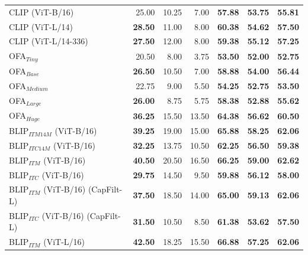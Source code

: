 \begin{table}[ht]
\begin{tabular}{l|rrr|rrr}
 CLIP (ViT-B/16)                     & 25.00          & 10.25          & 7.00           & \textbf{57.88} & \textbf{53.75} & \textbf{55.81} \\
 CLIP (ViT-L/14)                     & \textbf{28.50} & 11.00          & 8.00           & \textbf{60.38} & \textbf{54.62} & \textbf{57.50} \\
 CLIP (ViT-L/14-336)                 & \textbf{27.50} & 12.00          & 8.00           & \textbf{59.38} & \textbf{55.12} & \textbf{57.25} \\
 OFA$_{Tiny}$                        & 20.50          & 8.00           & 3.75           & \textbf{53.50} & \textbf{52.00} & \textbf{52.75} \\
 OFA$_{Base}$                        & \textbf{26.50} & 10.50          & 7.00           & \textbf{58.88} & \textbf{54.00} & \textbf{56.44} \\
 OFA$_{Medium}$                      & 22.75          & 9.00           & 5.50           & \textbf{54.25} & \textbf{52.75} & \textbf{53.50} \\
 OFA$_{Large}$                       & \textbf{26.00} & 8.75           & 5.75           & \textbf{58.38} & \textbf{52.88} & \textbf{55.62} \\
 OFA$_{Huge}$                        & \textbf{36.25} & 15.50          & 13.50          & \textbf{64.38} & \textbf{56.62} & \textbf{60.50} \\
 BLIP$_{ITM 14M}$ (ViT-B/16)         & \textbf{39.25} & 19.00          & 15.00          & \textbf{65.88} & \textbf{58.25} & \textbf{62.06} \\
 BLIP$_{ITC 14M}$ (ViT-B/16)         & \textbf{32.25} & 13.75          & 10.50          & \textbf{62.25} & \textbf{56.50} & \textbf{59.38} \\
 BLIP$_{ITM}$ (ViT-B/16)             & \textbf{40.50} & 20.50          & 16.50          & \textbf{66.25} & \textbf{59.00} & \textbf{62.62} \\
 BLIP$_{ITC}$ (ViT-B/16)             & \textbf{29.75} & 14.50          & 9.50           & \textbf{59.88} & \textbf{56.12} & \textbf{58.00} \\
 BLIP$_{ITM}$ (ViT-B/16) (CapFilt-L) & \textbf{37.50} & 18.50          & 14.00          & \textbf{65.00} & \textbf{59.13} & \textbf{62.06} \\
 BLIP$_{ITC}$ (ViT-B/16) (CapFilt-L) & \textbf{31.50} & 10.50          & 8.50           & \textbf{61.38} & \textbf{53.62} & \textbf{57.50} \\
 BLIP$_{ITM}$ (ViT-L/16)             & \textbf{42.50} & 18.25          & 15.50          & \textbf{66.88} & \textbf{57.25} & \textbf{62.06} \\

\end{tabular}
\end{table}
